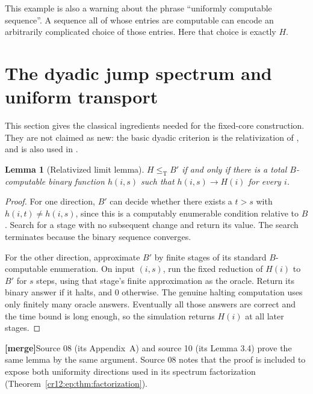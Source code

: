 \documentclass[11pt,letterpaper]{article}
\theoremstyle{plain}
\newtheorem{lemma}[theorem]{Lemma}
\theoremstyle{definition}
\theoremstyle{remark}
\numberwithin{equation}{section}
\newcommand{\leT}{\leq_{\mathrm T}}
\newcommand{\mergenote}[1]{\par\smallskip\noindent
 {\small\textsf{\textbf{[merge]}}\enspace #1}\par\smallskip}
\begin{document}
This example is also a warning about the phrase ``uniformly computable
sequence''. A sequence all of whose entries are computable can encode an
arbitrarily complicated choice of those entries. Here that choice is exactly
$H$.

\section{The dyadic jump spectrum and uniform transport}\label{cr12:sec:jump}
This section gives the classical ingredients needed for the fixed-core
construction. They are not claimed as new: the basic dyadic criterion is the
relativization of \cite[Theorem~2.19]{JS}, and is also used in \cite{Repo,HJS}.

\begin{lemma}[Relativized limit lemma]\label{cr12:lem:limit}
$H\leT B'$ if and only if there is a total $B$-computable binary function
$h(i,s)$ such that $h(i,s)\to H(i)$ for every $i$.
\end{lemma}
\begin{proof}
For one direction, $B'$ can decide whether there exists a $t>s$ with
$h(i,t)\ne h(i,s)$, since this is a computably enumerable condition relative
to $B$. Search for a stage with no subsequent change and return its value.
The search terminates because the binary sequence converges.

For the other direction, approximate $B'$ by finite stages of its standard
$B$-computable enumeration. On input $(i,s)$, run the fixed reduction of $H(i)$
to $B'$ for $s$ steps, using that stage's finite approximation as the oracle.
Return its binary answer if it halts, and $0$ otherwise. The genuine halting
computation uses only finitely many oracle answers. Eventually all those
answers are correct and the time bound is long enough, so the simulation
returns $H(i)$ at all later stages.
\end{proof}
\mergenote{Source 08 (its Appendix~A) and source 10 (its Lemma 3.4) prove the same
lemma by the same argument. Source 08 notes that the proof is included to expose
both uniformity directions used in its spectrum factorization
(Theorem~\ref{cr12:ep:thm:factorization}).}
\end{document}

